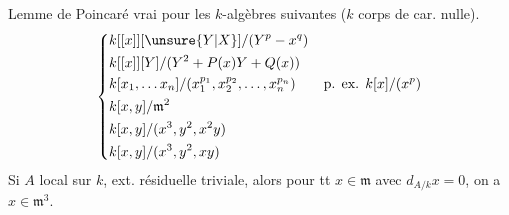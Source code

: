 Lemme de Poincaré vrai pour les $k$-algèbres suivantes ($k$ corps de car. nulle).
\[
\left\{\begin{aligned}
&k[[x]][\unsure{Y|X}]/(Y^p-x^q)\\
&k[[x]][Y]/(Y^2+P(x)Y+Q(x))\\
&k[x_1,\ldots x_n]/(x_1^{p_1},x_2^{p_2},\ldots,x_n^{p_n})\qquad\text{p. ex. }k[x]/(x^p)\\
&k[x,y]/\mathfrak m^2\\
&k[x,y]/(x^3,y^2,x^2y)\\
&k[x,y]/(x^3,y^2,xy)
\end{aligned}\right.
\]
Si $A$  local sur $k$, ext. résiduelle triviale, alors pour tt $x\in\mathfrak m$ avec $d_{A/k}x=0$, on a $x\in\mathfrak m^3$.

